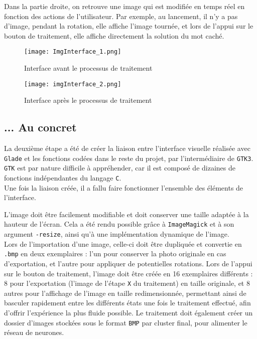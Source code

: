 \documentclass{article}
\begin{document}
Dans la partie droite, on retrouve une image qui est modifiée en temps réel en fonction des actions de l'utilisateur. Par exemple, au lancement, il n'y a pas d'image, pendant la rotation, elle affiche l'image tournée, et lors de l'appui sur le bouton de traitement, elle affiche directement la solution du mot caché.\\

\begin{figure}[H]
    \centering
    \texttt{[image: ImgInterface\_1.png]}
    \caption{Interface avant le processus de traitement}
\end{figure}

\begin{figure}[H]
    \centering
    \texttt{[image: imgInterface\_2.png]}
    \caption{Interface après le processus de traitement}
\end{figure}

\subsection{... Au concret}
La deuxième étape a été de créer la liaison entre l'interface visuelle réalisée avec \texttt{Glade} et les fonctions codées dans le reste du projet, par l'intermédiaire de \texttt{GTK3}. \texttt{GTK} est par nature difficile à appréhender, car il est composé de dizaines de fonctions indépendantes du langage \texttt{C}.\\

Une fois la liaison créée, il a fallu faire fonctionner l'ensemble des éléments de l'interface.

L'image doit être facilement modifiable et doit conserver une taille adaptée à la hauteur de l'écran. Cela a été rendu possible grâce à \texttt{ImageMagick} et à son argument \texttt{-resize}, ainsi qu'à une implémentation dynamique de l'image.\\

Lors de l'importation d'une image, celle-ci doit être dupliquée et convertie en \texttt{.bmp} en deux exemplaires : l'un pour conserver la photo originale en cas d'exportation, et l'autre pour appliquer de potentielles rotations. Lors de l'appui sur le bouton de traitement, l'image doit être créée en 16 exemplaires différents : 8 pour l'exportation (l'image de l'étape \texttt{X} du traitement) en taille originale, et 8 autres pour l'affichage de l'image en taille redimensionnée, permettant ainsi de basculer rapidement entre les différents états une fois le traitement effectué, afin d'offrir l'expérience la plus fluide possible. Le traitement doit également créer un dossier d'images stockées sous le format \texttt{BMP} par cluster final, pour alimenter le réseau de neurones.\\
\end{document}
